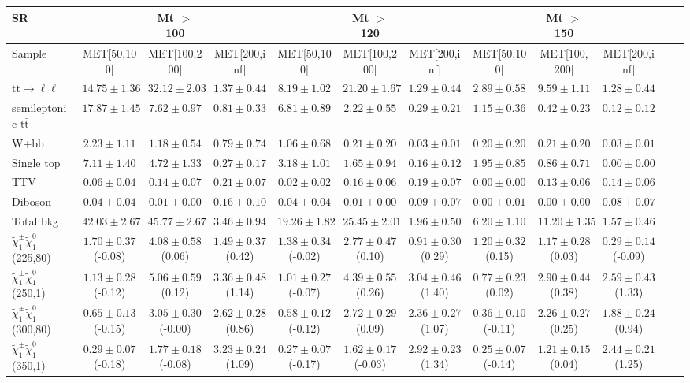 \begin{table}
\begin{center}
\small
\begin{tabular}{lccccccccccc}
\hline
SR & & Mt $>$ 100 & & & Mt $>$ 120 & & &Mt $>$ 150 & & &\\
\hline
Sample&MET[50,100]&MET[100,200]&MET[200,inf]&MET[50,100]&MET[100,200]&MET[200,inf]&MET[50,100]&MET[100,200]&MET[200,inf]&\\
\hline
$\mathrm{t}\bar{\mathrm{t}}\rightarrow \ell\ell$&$14.75\pm1.36$&$32.12\pm2.03$&$1.37\pm0.44$&$8.19\pm1.02$&$21.20\pm1.67$&$1.29\pm0.44$&$2.89\pm0.58$&$9.59\pm1.11$&$1.28\pm0.44$\\
semileptonic $\mathrm{t}\bar{\mathrm{t}}$&$17.87\pm1.45$&$7.62\pm0.97$&$0.81\pm0.33$&$6.81\pm0.89$&$2.22\pm0.55$&$0.29\pm0.21$&$1.15\pm0.36$&$0.42\pm0.23$&$0.12\pm0.12$\\
W+bb&$2.23\pm1.11$&$1.18\pm0.54$&$0.79\pm0.74$&$1.06\pm0.68$&$0.21\pm0.20$&$0.03\pm0.01$&$0.20\pm0.20$&$0.21\pm0.20$&$0.03\pm0.01$\\
Single top&$7.11\pm1.40$&$4.72\pm1.33$&$0.27\pm0.17$&$3.18\pm1.01$&$1.65\pm0.94$&$0.16\pm0.12$&$1.95\pm0.85$&$0.86\pm0.71$&$0.00\pm0.00$\\
TTV&$0.06\pm0.04$&$0.14\pm0.07$&$0.21\pm0.07$&$0.02\pm0.02$&$0.16\pm0.06$&$0.19\pm0.07$&$0.00\pm0.00$&$0.13\pm0.06$&$0.14\pm0.06$\\
Diboson&$0.04\pm0.04$&$0.01\pm0.00$&$0.16\pm0.10$&$0.04\pm0.04$&$0.01\pm0.00$&$0.09\pm0.07$&$0.00\pm0.01$&$0.00\pm0.00$&$0.08\pm0.07$\\
\hline
Total bkg&$42.03\pm2.67$&$45.77\pm2.67$&$3.46\pm0.94$&$19.26\pm1.82$&$25.45\pm2.01$&$1.96\pm0.50$&$6.20\pm1.10$&$11.20\pm1.35$&$1.57\pm0.46$\\
$\tilde{\chi}_{1}^{\pm}\tilde{\chi}_{1}^{0}$ (225,80)&$1.70\pm0.37$(-0.08)&$4.08\pm0.58$(0.06)&$1.49\pm0.37$(0.42)&$1.38\pm0.34$(-0.02)&$2.77\pm0.47$(0.10)&$0.91\pm0.30$(0.29)&$1.20\pm0.32$(0.15)&$1.17\pm0.28$(0.03)&$0.29\pm0.14$(-0.09)\\
$\tilde{\chi}_{1}^{\pm}\tilde{\chi}_{1}^{0}$ (250,1)&$1.13\pm0.28$(-0.12)&$5.06\pm0.59$(0.12)&$3.36\pm0.48$(1.14)&$1.01\pm0.27$(-0.07)&$4.39\pm0.55$(0.26)&$3.04\pm0.46$(1.40)&$0.77\pm0.23$(0.02)&$2.90\pm0.44$(0.38)&$2.59\pm0.43$(1.33)\\
$\tilde{\chi}_{1}^{\pm}\tilde{\chi}_{1}^{0}$ (300,80)&$0.65\pm0.13$(-0.15)&$3.05\pm0.30$(-0.00)&$2.62\pm0.28$(0.86)&$0.58\pm0.12$(-0.12)&$2.72\pm0.29$(0.09)&$2.36\pm0.27$(1.07)&$0.36\pm0.10$(-0.11)&$2.26\pm0.27$(0.25)&$1.88\pm0.24$(0.94)\\
$\tilde{\chi}_{1}^{\pm}\tilde{\chi}_{1}^{0}$ (350,1)&$0.29\pm0.07$(-0.18)&$1.77\pm0.18$(-0.08)&$3.23\pm0.24$(1.09)&$0.27\pm0.07$(-0.17)&$1.62\pm0.17$(-0.03)&$2.92\pm0.23$(1.34)&$0.25\pm0.07$(-0.14)&$1.21\pm0.15$(0.04)&$2.44\pm0.21$(1.25)\\
\hline
\hline\hline
\end{tabular}
\end{center}
\end{table}
